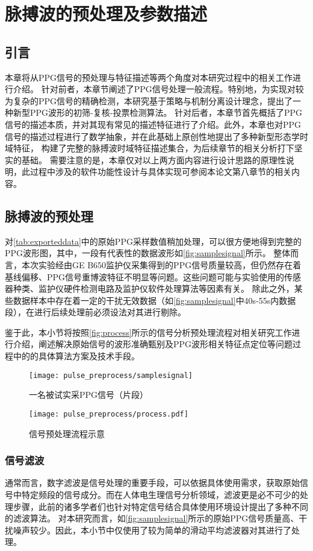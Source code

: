 \chapter{脉搏波的预处理及参数描述}
\section{引言}
本章将从PPG信号的预处理与特征描述等两个角度对本研究过程中的相关工作进行介绍。
针对前者，本章节阐述了PPG信号处理一般流程。特别地，为实现对较为复杂的PPG信号的精确检测，本研究基于策略与机制分离设计理念，提出了一种新型PPG波形的初筛-复核-投票检测算法。
针对后者，本章节首先概括了PPG信号的描述本质，并对其现有常见的描述特征进行了介绍。此外，本章也对PPG信号的描述过程进行了数学抽象，并在此基础上原创性地提出了多种新型形态学时域特征，
构建了完整的脉搏波时域特征描述集合，为后续章节的相关分析打下坚实的基础。
需要注意的是，本章仅对以上两方面内容进行设计思路的原理性说明，此过程中涉及的软件功能性设计与具体实现可参阅本论文第八章节的相关内容。
\section{脉搏波的预处理}
对\autoref{tab:exporteddata}中的原始PPG采样数值稍加处理，可以很方便地得到完整的PPG波形图，其中，一段有代表性的数据波形如\autoref{fig:samplesignal}所示。
整体而言，本次实验经由GE B650监护仪采集得到的PPG信号质量较高，但仍然存在着基线偏移、PPG信号重博波特征不明显等问题。这些问题可能与实验使用的传感器种类、监护仪硬件检测电路及监护仪软件处理算法等因素有关。
除此之外，某些数据样本中存在着一定的干扰无效数据（如\autoref{fig:samplesignal}中40s-55s内数据段），在进行后续处理前必须设法对其进行剔除。

鉴于此，本小节将按照\autoref{fig:process}所示的信号分析预处理流程对相关研究工作进行介绍，阐述解决原始信号的波形准确甄别及PPG波形相关特征点定位等问题过程中的的具体算法方案及技术手段。
\begin{figure}[htbp]
    \centering
    \texttt{[image: pulse\_preprocess/samplesignal]}
    \caption{\label{fig:samplesignal}一名被试实采PPG信号（片段）}
\end{figure}
\begin{figure}[htbp]
    \centering
    \texttt{[image: pulse\_preprocess/process.pdf]}
    \caption{\label{fig:process}信号预处理流程示意}
\end{figure}

\subsection{信号滤波}
通常而言，数字滤波是信号处理的重要手段，可以依据具体使用需求，获取原始信号中特定频段的信号成分。而在人体电生理信号分析领域，滤波更是必不可少的处理步骤，此前的诸多学者们也针对特定信号结合具体使用环境设计提出了多种不同的滤波算法。
对本研究而言，如\autoref{fig:samplesignal}所示的原始PPG信号质量高、干扰噪声较少。因此，本小节中仅使用了较为简单的滑动平均滤波器对其进行了处理。

